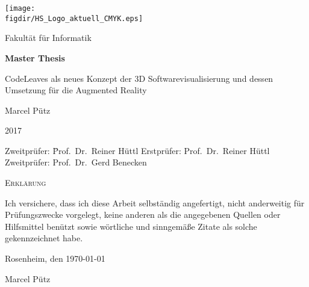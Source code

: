 \begin{titlepage}

%
%
%
%
%
%


\sffamily
\raggedleft

\texttt{[image: \\figdir/HS\_Logo\_aktuell\_CMYK.eps]}

\centering
\LARGE
Fakultät für Informatik  \vspace{0.5cm}\\

\vfill


\huge
\textbf{Master Thesis}
\vspace{1cm}

\LARGE
CodeLeaves als neues Konzept der 3D Softwarevisualisierung und dessen Umsetzung für die Augmented Reality
\vspace{1cm}

\Large
Marcel Pütz

2017

\vspace{2cm}

\flushleft
\Large
\vfill
\begin{tabbing}
Zweitprüfer: \= Prof.\ Dr.\ Reiner Hüttl \kill
Erstprüfer: \> Prof.\ Dr.\ Reiner Hüttl\\
Zweitprüfer: \> Prof.\ Dr.\ Gerd Benecken
\end{tabbing}

\end{titlepage}

\cleardoubleemptypage

{
\large
\thispagestyle{empty}
\vspace*{\fill}

\noindent
\textsc{Erklärung}

\medskip

\noindent
Ich versichere, dass ich diese Arbeit selbständig
angefertigt, nicht anderweitig für Prüfungszwecke
vorgelegt, keine anderen als die angegebenen Quellen
oder Hilfsmittel benützt sowie wörtliche und
sinngemäße Zitate als solche gekennzeichnet habe.

\bigskip

\noindent
Rosenheim, den \today

\vspace*{2cm}

\noindent
Marcel Pütz
}

